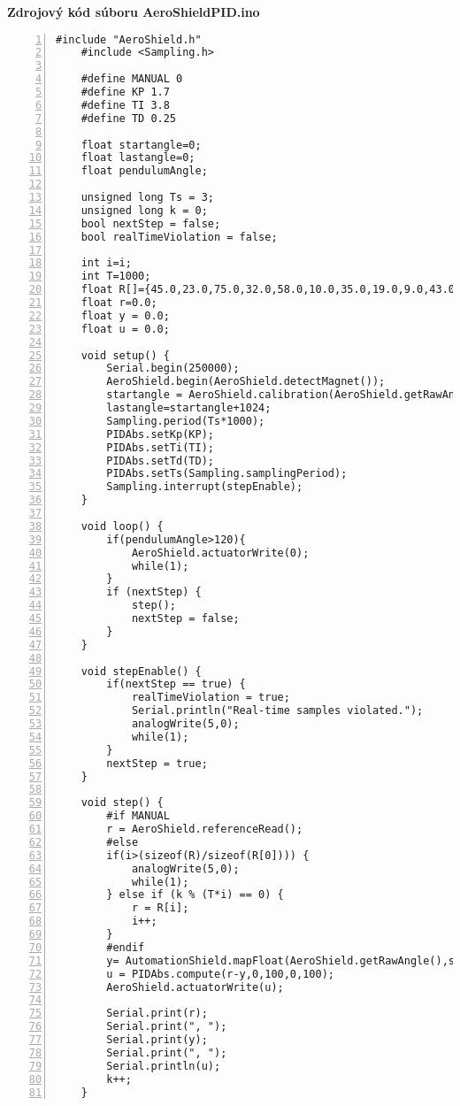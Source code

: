 \LARGE\bf{Zdrojový kód súboru AeroShieldPID.ino}
\label{AeroShieldPID.ino}
\vspace{1cm}
\begin{lstlisting}[numbers=left,basicstyle=\scriptsize,caption={Zdrojový kód súboru AeroShieldPID.ino.},captionpos=b]	
	#include "AeroShield.h"              
	#include <Sampling.h>   
	
	#define MANUAL 0    
	#define KP 1.7  
	#define TI 3.8  
	#define TD 0.25   
	
	float startangle=0; 
	float lastangle=0; 
	float pendulumAngle;
	
	unsigned long Ts = 3; 
	unsigned long k = 0; 
	bool nextStep = false;  
	bool realTimeViolation = false;
	
	int i=i;          
	int T=1000;           
	float R[]={45.0,23.0,75.0,32.0,58.0,10.0,35.0,19.0,9.0,43.0,23.0,65.0,15.0,80.0}; 
	float r=0.0;          
	float y = 0.0;        
	float u = 0.0;         
	
	void setup() {           
		Serial.begin(250000);                         
		AeroShield.begin(AeroShield.detectMagnet());
		startangle = AeroShield.calibration(AeroShield.getRawAngle()); 
		lastangle=startangle+1024;                                  
		Sampling.period(Ts*1000);      
		PIDAbs.setKp(KP);       
		PIDAbs.setTi(TI);    
		PIDAbs.setTd(TD);     
		PIDAbs.setTs(Sampling.samplingPeriod); 
		Sampling.interrupt(stepEnable); 
	}
	
	void loop() {
		if(pendulumAngle>120){
			AeroShield.actuatorWrite(0);
			while(1);
		} 
		if (nextStep) {    
			step();          
			nextStep = false;  
		}
	}
	
	void stepEnable() {             
		if(nextStep == true) {         
			realTimeViolation = true;   
			Serial.println("Real-time samples violated."); 
			analogWrite(5,0);  
			while(1);    
		}
		nextStep = true; 
	}
	
	void step() {  
		#if MANUAL                       
		r = AeroShield.referenceRead(); 
		#else        
		if(i>(sizeof(R)/sizeof(R[0]))) {  
			analogWrite(5,0); 
			while(1); 
		} else if (k % (T*i) == 0) {
			r = R[i];
			i++; 
		}
		#endif
		y= AutomationShield.mapFloat(AeroShield.getRawAngle(),startangle,lastangle,0.00,100.00);
		u = PIDAbs.compute(r-y,0,100,0,100);
		AeroShield.actuatorWrite(u);
		
		Serial.print(r);
		Serial.print(", ");
		Serial.print(y); 
		Serial.print(", ");
		Serial.println(u); 
		k++; 
	}
\end{lstlisting}